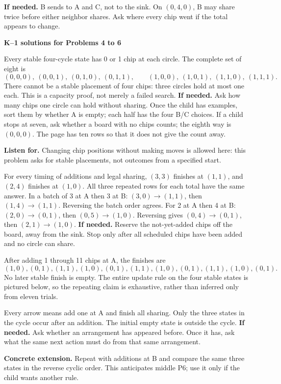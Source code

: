 \documentclass[11pt,letterpaper]{article}
\newcommand{\pagehead}[1]{{\Large\bfseries #1}\par\vspace{3pt}}
\newcommand{\prob}[2]{\par\vspace{5pt}{\large\bfseries #1}\par #2}
\newcommand{\hint}[1]{\textbf{If needed.} #1\par}
\newcommand{\notice}[1]{\textbf{Listen for.} #1\par}
\begin{document}
\hint{B sends to A and C, not to the sink. On $(0,4,0)$, B may share twice before either neighbor shares. Ask where every chip went if the total appears to change.}

\newpage
\pagehead{K--1 solutions for Problems 4 to 6}\label{kcycle}
\prob{Problem 4}{Every stable four-cycle state has 0 or 1 chip at each circle. The complete set of eight is}
\[
(0,0,0),\ (0,0,1),\ (0,1,0),\ (0,1,1),
\qquad
(1,0,0),\ (1,0,1),\ (1,1,0),\ (1,1,1).
\]
There cannot be a stable placement of four chips: three circles hold at most one each. This is a capacity proof, not merely a failed search.
\hint{Ask how many chips one circle can hold without sharing. Once the child has examples, sort them by whether A is empty; each half has the four B/C choices. If a child stops at seven, ask whether a board with no chips counts; the eighth way is $(0,0,0)$. The page has ten rows so that it does not give the count away.}
\notice{Changing chip positions without making moves is allowed here: this problem asks for stable placements, not outcomes from a specified start.}
\prob{Problem 5}{For every timing of additions and legal sharing, $(3,3)$ finishes at $(1,1)$, and $(2,4)$ finishes at $(1,0)$. All three repeated rows for each total have the same answer. In a batch of 3 at A then 3 at B: $(3,0)\to(1,1)$, then $(1,4)\to(1,1)$. Reversing the batch order agrees. For 2 at A then 4 at B: $(2,0)\to(0,1)$, then $(0,5)\to(1,0)$. Reversing gives $(0,4)\to(0,1)$, then $(2,1)\to(1,0)$.}
\hint{Reserve the not-yet-added chips off the board, away from the sink. Stop only after all scheduled chips have been added and no circle can share.}
\prob{Problem 6}{After adding 1 through 11 chips at A, the finishes are}
\[
(1,0),(0,1),(1,1),(1,0),(0,1),(1,1),
(1,0),(0,1),(1,1),(1,0),(0,1).
\]
No later stable finish is empty. The entire update rule on the four stable states is pictured below, so the repeating claim is exhaustive, rather than inferred only from eleven trials.
\begin{center}
\end{center}
Every arrow means add one at A and finish all sharing. Only the three states in the cycle occur after an addition. The initial empty state is outside the cycle.
\hint{Ask whether an arrangement has appeared before. Once it has, ask what the same next action must do from that same arrangement.}
\textbf{Concrete extension.} Repeat with additions at B and compare the same three states in the reverse cyclic order. This anticipates middle P6; use it only if the child wants another rule.
\end{document}
